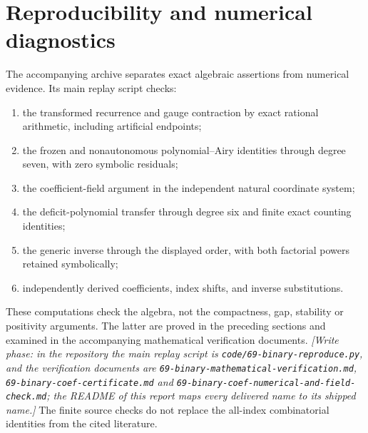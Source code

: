 \documentclass[11pt,letterpaper]{article}
\theoremstyle{remark}
\begin{document}
\section{Reproducibility and numerical diagnostics}\label{tcn:b:sec:numerics}
The accompanying archive separates exact algebraic assertions from numerical evidence. Its main replay script checks:
\begin{enumerate}
 \item the transformed recurrence and gauge contraction by exact rational arithmetic, including artificial endpoints;
 \item the frozen and nonautonomous polynomial--Airy identities through degree seven, with zero symbolic residuals;
 \item the coefficient-field argument in the independent natural coordinate system;
 \item the deficit-polynomial transfer through degree six and finite exact counting identities;
 \item the generic inverse through the displayed order, with both factorial powers retained symbolically;
 \item independently derived coefficients, index shifts, and inverse substitutions.
\end{enumerate}
These computations check the algebra, not the compactness, gap, stability or positivity arguments. The latter are proved in the preceding sections and examined in the accompanying mathematical verification documents. \emph{[Write phase: in the repository the main replay script is \textup{\nolinkurl{code/69-binary-reproduce.py}}, and the verification documents are \textup{\nolinkurl{69-binary-mathematical-verification.md}}, \textup{\nolinkurl{69-binary-coef-certificate.md}} and \textup{\nolinkurl{69-binary-coef-numerical-and-field-check.md}}; the README of this report maps every delivered name to its shipped name.]} The finite source checks do not replace the all-index combinatorial identities from the cited literature.
\end{document}
